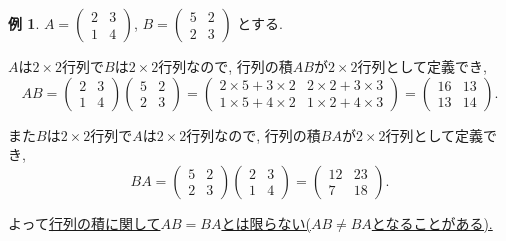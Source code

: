\documentclass[dvipdfmx,a4paper,11pt]{article}
\theoremstyle{definition}
\newtheorem{exa}[thm]{例}
\begin{document}
 
 \begin{exa}
 $ A= 
 \begin{pmatrix}
2 & 3\\
1 & 4
 \end{pmatrix}
 $, $
 B = 
 \begin{pmatrix}
5 & 2\\
2 & 3
 \end{pmatrix}
 $
 とする. 
 
 $A$は$2\times 2$行列で$B$は$2 \times 2$行列なので, 行列の積$AB$が$2 \times 2$行列として定義でき, 
 $$
 AB = 
 \begin{pmatrix}
2 & 3\\
1 & 4
 \end{pmatrix}
 \begin{pmatrix}
5 & 2\\
2 & 3
 \end{pmatrix}
 =  
 \begin{pmatrix}
2 \times 5 + 3 \times 2& 2 \times 2 + 3 \times 3\\
1 \times 5 + 4 \times 2 & 1\times 2 + 4 \times 3
 \end{pmatrix}
 = 
 \begin{pmatrix}
16 & 13\\
13 & 14
 \end{pmatrix}.
 $$
 
また$B$は$2\times 2$行列で$A$は$2 \times 2$行列なので, 行列の積$BA$が$2 \times 2$行列として定義でき, 
 $$
 BA = 
  \begin{pmatrix}
5 & 2\\
2 & 3
 \end{pmatrix}
  \begin{pmatrix}
2 & 3\\
1 & 4
 \end{pmatrix}
 =
  \begin{pmatrix}
12 & 23\\
7 & 18
 \end{pmatrix}.
 $$

よって\underline{行列の積に関して$AB=BA$とは限らない($AB \neq BA$となることがある).}
 \end{exa}
 
 
 
\end{document}
